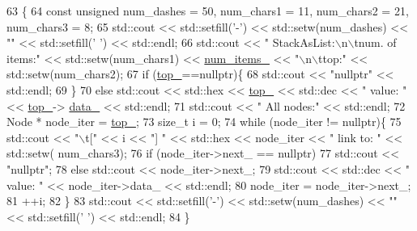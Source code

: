 \begin{DoxyCode}
63                                    \{
64         \textcolor{keyword}{const} \textcolor{keywordtype}{unsigned} num\_dashes = 50, num\_chars1 = 11, num\_chars2 = 21, num\_chars3 = 8;
65         std::cout << std::setfill(\textcolor{charliteral}{'-'}) << std::setw(num\_dashes) << \textcolor{stringliteral}{""} << std::setfill(\textcolor{charliteral}{' '}) << std::endl;
66         std::cout << \textcolor{stringliteral}{"   StackAsList:\(\backslash\)n\(\backslash\)tnum. of items:"} << std::setw(num\_chars1) << 
      \hyperlink{classstacks_1_1_stack_as_list_a09f45c7af846b515531bd9368b772f27}{num\_items\_} << \textcolor{stringliteral}{"\(\backslash\)n\(\backslash\)ttop:"} << std::setw(num\_chars2);
67         \textcolor{keywordflow}{if} (\hyperlink{classstacks_1_1_stack_as_list_a0e0590bb339a3fb55b8f1cdac941769a}{top\_}==\textcolor{keyword}{nullptr})\{
68             std::cout << \textcolor{stringliteral}{"nullptr"} << std::endl;
69         \}
70         \textcolor{keywordflow}{else} std::cout << std::hex << \hyperlink{classstacks_1_1_stack_as_list_a0e0590bb339a3fb55b8f1cdac941769a}{top\_} << std::dec << \textcolor{stringliteral}{" value: "} << \hyperlink{classstacks_1_1_stack_as_list_a0e0590bb339a3fb55b8f1cdac941769a}{top\_}->
      \hyperlink{structstacks_1_1_stack_as_list_1_1_node_a088b1a89491b40c68e329991d1a13192}{data\_} << std::endl;
71         std::cout << \textcolor{stringliteral}{"    All nodes:"} << std::endl;
72         Node * node\_iter = \hyperlink{classstacks_1_1_stack_as_list_a0e0590bb339a3fb55b8f1cdac941769a}{top\_};
73         \textcolor{keywordtype}{size\_t} i = 0;
74         \textcolor{keywordflow}{while} (node\_iter != \textcolor{keyword}{nullptr})\{
75             std::cout << \textcolor{stringliteral}{"\(\backslash\)t["} << i << \textcolor{stringliteral}{"] "} << std::hex << node\_iter << \textcolor{stringliteral}{" link to: "} << std::setw(
      num\_chars3);
76             \textcolor{keywordflow}{if} (node\_iter->next\_ == \textcolor{keyword}{nullptr})
77                 std::cout << \textcolor{stringliteral}{"nullptr"};
78             \textcolor{keywordflow}{else} std::cout << node\_iter->next\_;
79             std::cout << std::dec << \textcolor{stringliteral}{" value: "} << node\_iter->data\_ << std::endl;
80             node\_iter = node\_iter->next\_;
81             ++i;
82         \}
83         std::cout << std::setfill(\textcolor{charliteral}{'-'}) << std::setw(num\_dashes) << \textcolor{stringliteral}{""} << std::setfill(\textcolor{charliteral}{' '}) << std::endl;
84     \}
\end{DoxyCode}
\hypertarget{classstacks_1_1_stack_as_list_a56147e51e4a0c2fef70e6d40a7a0b63d}{}
